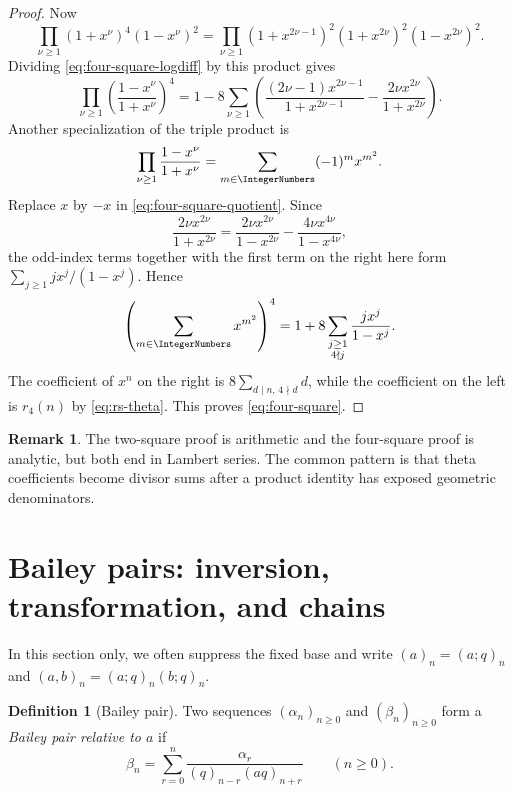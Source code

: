 \documentclass[11pt,oneside]{article}
\theoremstyle{definition}
\newtheorem{definition}[theorem]{Definition}
\newtheorem{remark}[theorem]{Remark}
\begin{document}
\begin{proof}
Now
\[
 \prod_{\nu\ge1}(1+x^\nu)^4(1-x^\nu)^2
 =
 \prod_{\nu\ge1}
 (1+x^{2\nu-1})^2(1+x^{2\nu})^2(1-x^{2\nu})^2.
\]
Dividing \eqref{eq:four-square-logdiff} by this product gives
\begin{equation}\label{eq:four-square-quotient}
 \prod_{\nu\ge1}\left(\frac{1-x^\nu}{1+x^\nu}\right)^4
 =
 1-8\sum_{\nu\ge1}\left(
 \frac{(2\nu-1)x^{2\nu-1}}{1+x^{2\nu-1}}
 -\frac{2\nu x^{2\nu}}{1+x^{2\nu}}
 \right).
\end{equation}
Another specialization of the triple product is
\[
 \prod_{\nu\ge1}\frac{1-x^\nu}{1+x^\nu}
 =\sum_{m\in\IntegerNumbers}(-1)^m x^{m^2}.
\]
Replace $x$ by $-x$ in \eqref{eq:four-square-quotient}.  Since
\[
 \frac{2\nu x^{2\nu}}{1+x^{2\nu}}
 =\frac{2\nu x^{2\nu}}{1-x^{2\nu}}
  -\frac{4\nu x^{4\nu}}{1-x^{4\nu}},
\]
the odd-index terms together with the first term on the right here form
$\sum_{j\ge1}j x^j/(1-x^j)$.  Hence
\begin{equation}\label{eq:four-square-lambert}
 \left(\sum_{m\in\IntegerNumbers}x^{m^2}\right)^4
 =
 1+8\sum_{\substack{j\ge1\\4\nmid j}}
 \frac{j x^j}{1-x^j}.
\end{equation}
The coefficient of $x^n$ on the right is
$8\sum_{d\mid n,\,4\nmid d}d$, while the coefficient on the left is
$r_4(n)$ by \eqref{eq:rs-theta}.  This proves \eqref{eq:four-square}.
\end{proof}

\begin{remark}
The two-square proof is arithmetic and the four-square proof is analytic,
but both end in Lambert series.  The common pattern is that theta
coefficients become divisor sums after a product identity has exposed
geometric denominators.
\end{remark}


\section{Bailey pairs: inversion, transformation, and chains}\label{sec:bailey}

In this section only, we often suppress the fixed base and write
$(a)_n=(a;q)_n$ and $(a,b)_n=(a;q)_n(b;q)_n$.

\begin{definition}[Bailey pair]\label{def:bailey-pair}
Two sequences $(\alpha_n)_{n\ge0}$ and $(\beta_n)_{n\ge0}$ form a
\emph{Bailey pair relative to $a$} if
\begin{equation}\label{eq:bailey-pair}
 \beta_n=\sum_{r=0}^{n}
 \frac{\alpha_r}{(q)_{n-r}(aq)_{n+r}}
 \qquad(n\ge0).
\end{equation}
\end{definition}
\end{document}
